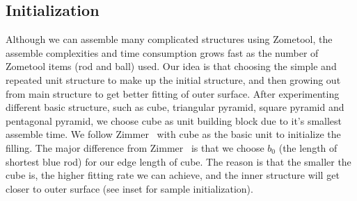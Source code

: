 \subsection{Initialization}
Although we can assemble many complicated structures using Zometool, the assemble complexities and time consumption grows  fast as the number of Zometool items (rod and ball) used.
Our idea is that choosing the simple and repeated unit structure to make up the initial structure, and then growing out from main structure to get better fitting of outer surface. 
After experimenting different basic structure, such as cube, triangular pyramid, square pyramid and pentagonal pyramid, we choose cube as unit building block due to it's smallest assemble time.
We follow Zimmer~\cite{zimmer:2014:Zometool} with cube as the basic unit to initialize the filling. 
The major difference from Zimmer~\cite{zimmer:2014:Zometool} is that we choose $b_0$ (the length of shortest blue rod) for our edge length of cube. 
The reason is that the smaller the cube is, the higher fitting rate we can achieve, and the inner structure will get closer to  outer surface (see inset for sample initialization). 



